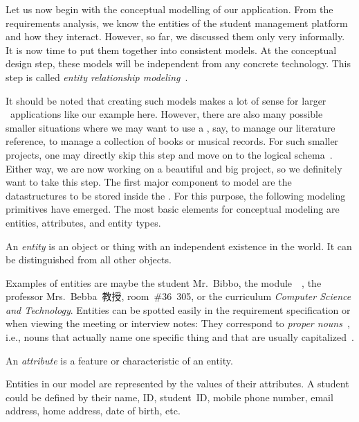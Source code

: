 %
\label{sec:conceptualSchemaDesign}%
%
Let us now begin with the conceptual modelling of our application.
From the requirements analysis, we know the entities of the student management platform and how they interact.
However, so far, we discussed them only very informally.
It is now time to put them together into consistent models.
At the conceptual design step, these models will be independent from any concrete technology.
This step is called \emph{entity relationship modeling}~\cite{G2011EW2ITDS:CMUTERM,SS2005EIDDDFDB:CDDRAAML,SS2005EIDDDFDB:CDDICAMP,V1999C5DMS:CDUTERM}.

It should be noted that creating such models makes a lot of sense for larger \db\ applications like our example here.
However, there are also many possible smaller situations where we may want to use a \db, say, to manage our literature reference, to manage a collection of books or musical records.
For such smaller projects, one may directly skip this step and move on to the logical schema~\cite{S2024D:CDMERDE}.
Either way, we are now working on a beautiful and big project, so we definitely want to take this step.
%
%
%
The first major component to model are the datastructures to be stored inside the \db.
For this purpose, the following modeling primitives have emerged.%
%
%
%
The most basic elements for conceptual modeling are entities, attributes, and entity types.%
%
\begin{definition}[Entity]%
An \emph{entity} is an object or thing with an independent existence in the world. %
It can be distinguished from all other objects.%
\end{definition}%
%
Examples of entities are maybe the student Mr.~Bibbo, the module~~\cite{programmingWithPython}, the professor Mrs.~Bebba~教授, room~\#36~305, or the curriculum \emph{Computer Science and Technology}.
Entities can be spotted easily in the requirement specification or when viewing the meeting or interview notes:
They correspond to \emph{proper nouns}~\cite{S2024D:CDMERDE}, i.e., nouns that actually name one specific thing and that are usually capitalized~\cite{EOWM2025MWAMTD:CAPNWTDLWOGC}.%
%
\begin{definition}[Attribute]%
An \emph{attribute} is a feature or characteristic of an entity.%
\end{definition}%
%
Entities in our model are represented by the values of their attributes.
A student could be defined by their name, ID, student~ID, mobile phone number, email address, home address, date of birth, etc.
